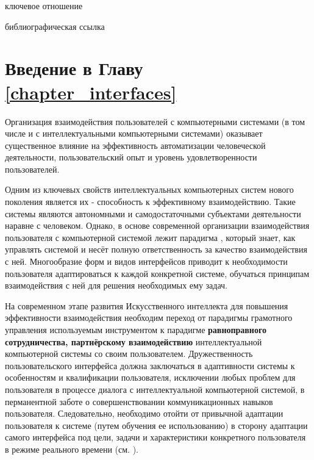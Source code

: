 \begin{SCn}
\bigskip

\begin{scnrelfromlist}{ключевое отношение}
\end{scnrelfromlist}

\bigskip

\begin{scnrelfromlist}{библиографическая ссылка}
	\scnitem{}
\end{scnrelfromlist}
\end{SCn}

\section*{Введение в Главу \ref{chapter_interfaces}}

Организация взаимодействия пользователей с компьютерными системами (в том числе и с интеллектуальными компьютерными системами) оказывает существенное влияние на эффективность автоматизации человеческой деятельности, пользовательский опыт и уровень удовлетворенности пользователей. 

Одним из ключевых свойств интеллектуальных компьютерных систем нового поколения является их  - способность к эффективному взаимодействию. Такие системы являются автономными и самодостаточными субъектами деятельности наравне с человеком. Однако, в основе современной организации взаимодействия пользователя с компьютерной системой лежит парадигма , который знает, как управлять системой и несёт полную ответственность за качество взаимодействия с ней. Многообразие форм и видов интерфейсов приводит к необходимости пользователя адаптироваться к каждой конкретной системе, обучаться принципам взаимодействия с ней для решения необходимых ему задач.

На современном этапе развития Искусственного интеллекта для повышения эффективности взаимодействия необходим переход от парадигмы грамотного управления используемым инструментом к парадигме \textbf{равноправного сотрудничества, партнёрскому взаимодействию} интеллектуальной компьютерной системы со своим пользователем. Дружественность пользовательского интерфейса должна заключаться в адаптивности системы к особенностям и квалификации пользователя, исключении любых проблем для пользователя в процессе диалога с интеллектуальной компьютерной системой, в перманентной заботе о совершенствовании коммуникационных навыков пользователя. Следовательно, необходимо отойти от привычной адаптации пользователя к системе (путем обучения ее использованию) в сторону адаптации самого интерфейса под цели, задачи и характеристики конкретного пользователя в режиме реального времени (см. ).

